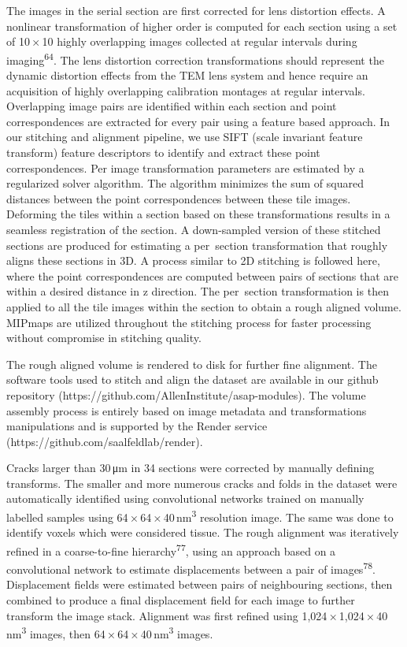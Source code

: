 \documentclass{article}
\begin{document}
The images in the serial section are first corrected for lens distortion effects. A nonlinear transformation of higher order is computed for each section using a set of 10\,×\,10 highly overlapping images collected at regular intervals during imaging\textsuperscript{64}. The lens distortion correction transformations should represent the dynamic distortion effects from the TEM lens system and hence require an acquisition of highly overlapping calibration montages at regular intervals. Overlapping image pairs are identified within each section and point correspondences are extracted for every pair using a feature based approach. In our stitching and alignment pipeline, we use SIFT (scale invariant feature transform) feature descriptors to identify and extract these point correspondences. Per image transformation parameters are estimated by a regularized solver algorithm. The algorithm minimizes the sum of squared distances between the point correspondences between these tile images. Deforming the tiles within a section based on these transformations results in a seamless registration of the section. A down-sampled version of these stitched sections are produced for estimating a per~section transformation that roughly aligns these sections in 3D. A process similar to 2D stitching is followed here, where the point correspondences are computed between pairs of sections that are within a desired distance in z direction. The per~section transformation is then applied to all the tile images within the section to obtain a rough aligned volume. MIPmaps are utilized throughout the stitching process for faster processing without compromise in stitching quality.

The rough aligned volume is rendered to disk for further fine alignment. The software tools used to stitch and align the dataset are available in our github repository (https://github.com/AllenInstitute/asap-modules). The volume assembly process is entirely based on image metadata and transformations manipulations and is supported by the Render service (https://github.com/saalfeldlab/render).

Cracks larger than 30\,μm in 34 sections were corrected by manually defining transforms. The smaller and more numerous cracks and folds in the dataset were automatically identified using convolutional networks trained on manually labelled samples using 64\,×\,64\,×\,40\,nm\textsuperscript{3} resolution image. The same was done to identify voxels which were considered tissue. The rough alignment was iteratively refined in a coarse-to-fine hierarchy\textsuperscript{77}, using an approach based on a convolutional network to estimate displacements between a pair of images\textsuperscript{78}. Displacement fields were estimated between pairs of neighbouring sections, then combined to produce a final displacement field for each image to further transform the image stack. Alignment was first refined using 1,024\,×\,1,024\,×\,40\,nm\textsuperscript{3} images, then 64\,×\,64\,×\,40\,nm\textsuperscript{3} images.
\end{document}
